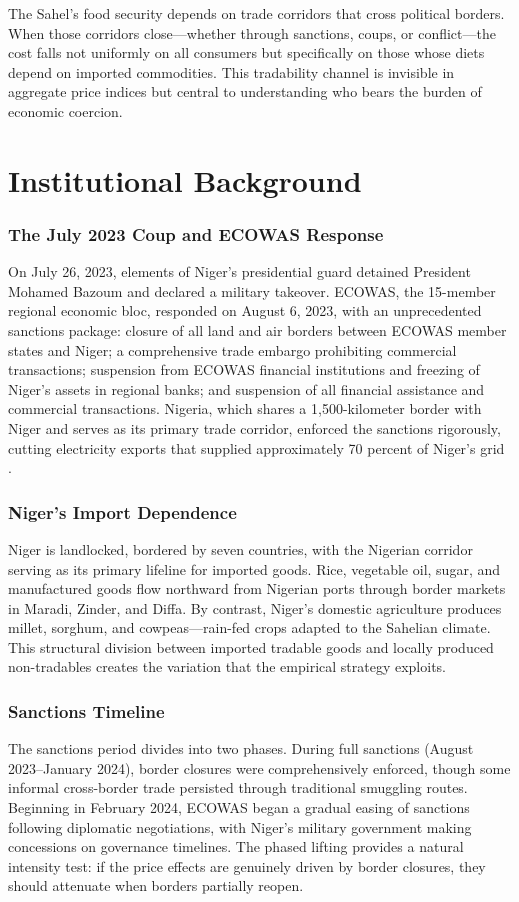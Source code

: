 \documentclass[12pt]{article}
\begin{document}
The Sahel's food security depends on trade corridors that cross political borders. When those corridors close---whether through sanctions, coups, or conflict---the cost falls not uniformly on all consumers but specifically on those whose diets depend on imported commodities. This tradability channel is invisible in aggregate price indices but central to understanding who bears the burden of economic coercion.

\section{Institutional Background}

\subsubsection*{The July 2023 Coup and ECOWAS Response} On July 26, 2023, elements of Niger's presidential guard detained President Mohamed Bazoum and declared a military takeover. ECOWAS, the 15-member regional economic bloc, responded on August 6, 2023, with an unprecedented sanctions package: closure of all land and air borders between ECOWAS member states and Niger; a comprehensive trade embargo prohibiting commercial transactions; suspension from ECOWAS financial institutions and freezing of Niger's assets in regional banks; and suspension of all financial assistance and commercial transactions. Nigeria, which shares a 1,500-kilometer border with Niger and serves as its primary trade corridor, enforced the sanctions rigorously, cutting electricity exports that supplied approximately 70 percent of Niger's grid \citep{ilo2023}.

\subsubsection*{Niger's Import Dependence} Niger is landlocked, bordered by seven countries, with the Nigerian corridor serving as its primary lifeline for imported goods. Rice, vegetable oil, sugar, and manufactured goods flow northward from Nigerian ports through border markets in Maradi, Zinder, and Diffa. By contrast, Niger's domestic agriculture produces millet, sorghum, and cowpeas---rain-fed crops adapted to the Sahelian climate. This structural division between imported tradable goods and locally produced non-tradables creates the variation that the empirical strategy exploits.

\subsubsection*{Sanctions Timeline} The sanctions period divides into two phases. During full sanctions (August 2023--January 2024), border closures were comprehensively enforced, though some informal cross-border trade persisted through traditional smuggling routes. Beginning in February 2024, ECOWAS began a gradual easing of sanctions following diplomatic negotiations, with Niger's military government making concessions on governance timelines. The phased lifting provides a natural intensity test: if the price effects are genuinely driven by border closures, they should attenuate when borders partially reopen.
\end{document}
